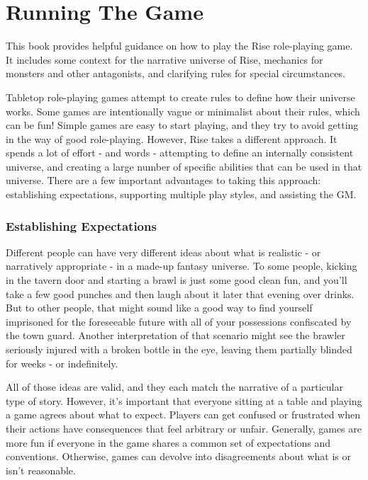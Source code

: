 \chapter{Running The Game}

This book provides helpful guidance on how to play the Rise role-playing game.
It includes some context for the narrative universe of Rise, mechanics for monsters and other antagonists, and clarifying rules for special circumstances.


  Tabletop role-playing games attempt to create rules to define how their universe works.
  Some games are intentionally vague or minimalist about their rules, which can be fun!
  Simple games are easy to start playing, and they try to avoid getting in the way of good role-playing.
  However, Rise takes a different approach.
  It spends a lot of effort - and words - attempting to define an internally consistent universe, and creating a large number of specific abilities that can be used in that universe.
  There are a few important advantages to taking this approach: establishing expectations, supporting multiple play styles, and assisting the GM.

  \subsection{Establishing Expectations}
    Different people can have very different ideas about what is realistic - or narratively appropriate - in a made-up fantasy universe.
    To some people, kicking in the tavern door and starting a brawl is just some good clean fun, and you'll take a few good punches and then laugh about it later that evening over drinks.
    But to other people, that might sound like a good way to find yourself imprisoned for the foreseeable future with all of your possessions confiscated by the town guard.
    Another interpretation of that scenario might see the brawler seriously injured with a broken bottle in the eye, leaving them partially blinded for weeks - or indefinitely.

    All of those ideas are valid, and they each match the narrative of a particular type of story.
    However, it's important that everyone sitting at a table and playing a game agrees about what to expect.
    Players can get confused or frustrated when their actions have consequences that feel arbitrary or unfair.
    Generally, games are more fun if everyone in the game shares a common set of expectations and conventions.
    Otherwise, games can devolve into disagreements about what is or isn't reasonable.

